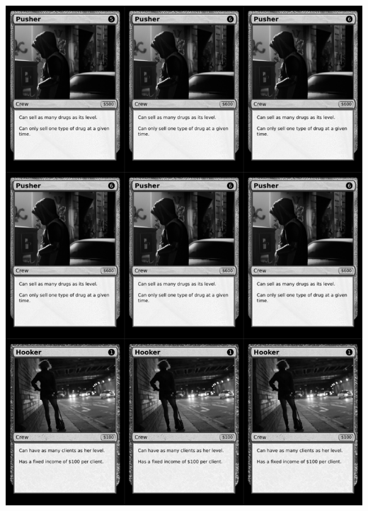 \documentclass[a4paper]{article}
\begin{document}
\newpage

\begin{center}
	\centering
	\includegraphics[width=200.5mm,height=280.7mm]{output/temp/page12.png}
\end{center}
\end{document}
